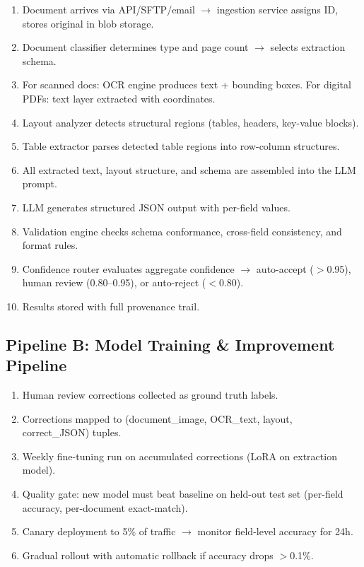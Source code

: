 \begin{enumerate}
  \item Document arrives via API/SFTP/email $\rightarrow$ ingestion service assigns ID, stores original in blob storage.
  \item Document classifier determines type and page count $\rightarrow$ selects extraction schema.
  \item For scanned docs: OCR engine produces text + bounding boxes. For digital PDFs: text layer extracted with coordinates.
  \item Layout analyzer detects structural regions (tables, headers, key-value blocks).
  \item Table extractor parses detected table regions into row-column structures.
  \item All extracted text, layout structure, and schema are assembled into the LLM prompt.
  \item LLM generates structured JSON output with per-field values.
  \item Validation engine checks schema conformance, cross-field consistency, and format rules.
  \item Confidence router evaluates aggregate confidence $\rightarrow$ auto-accept ($>$0.95), human review (0.80--0.95), or auto-reject ($<$0.80).
  \item Results stored with full provenance trail.
\end{enumerate}

\subsection*{Pipeline B: Model Training \& Improvement Pipeline}

\begin{enumerate}
  \item Human review corrections collected as ground truth labels.
  \item Corrections mapped to (document\_image, OCR\_text, layout, correct\_JSON) tuples.
  \item Weekly fine-tuning run on accumulated corrections (LoRA on extraction model).
  \item Quality gate: new model must beat baseline on held-out test set (per-field accuracy, per-document exact-match).
  \item Canary deployment to 5\% of traffic $\rightarrow$ monitor field-level accuracy for 24h.
  \item Gradual rollout with automatic rollback if accuracy drops $>$0.1\%.
\end{enumerate}

